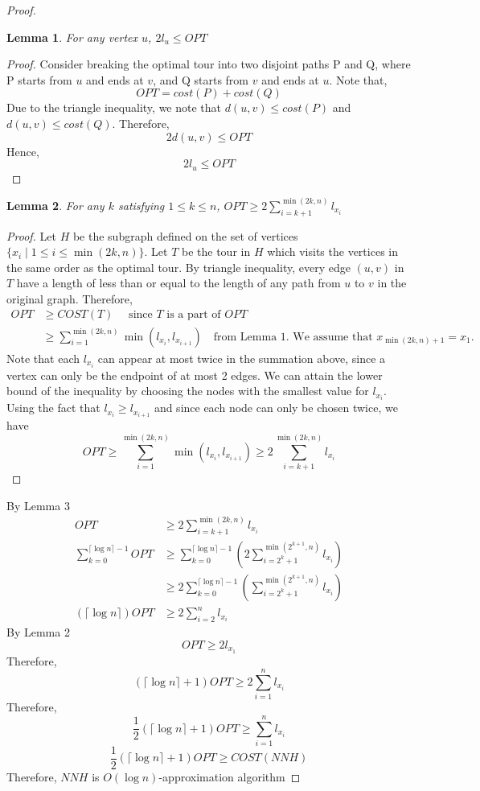\documentclass[paper=a4, fontsize=11pt]{scrartcl}	%
\numberwithin{equation}{section}		%
\numberwithin{figure}{section}			%
\numberwithin{table}{section}				%
\newtheorem{lemma}{Lemma}
\begin{document}
\begin{proof}
\begin{lemma}
For any vertex $u$, $2l_{u}\leq OPT$
\end{lemma}
\begin{proof}
Consider breaking the optimal tour into two disjoint paths P and Q, where P starts from $u$ and ends at $v$, and Q starts from $v$ and ends at $u$. Note that, 
\[OPT = cost(P) + cost(Q)\]
Due to the triangle inequality, we note that $d(u,v)\leq cost(P)$ and $d(u,v)\leq cost(Q)$. Therefore, 
\[2d(u,v)\leq OPT\]
Hence, 
\[2l_{u}\leq OPT\]
\end{proof}
\begin{lemma}
For any $k$ satisfying $1\leq k\leq n$, $OPT\geq 2\sum\limits_{i=k+1}^{\min(2k,n)}l_{x_i}$
\end{lemma}
\begin{proof}
Let $H$ be the subgraph defined on the set of vertices $\{x_i\mid 1\leq i \leq \min(2k,n)\}$. Let $T$ be the tour in $H$ which visits the vertices in the same order as the optimal tour. By triangle inequality, every edge $(u,v)$ in $T$ have a length of less than or equal to the length of any path from $u$ to $v$ in the original graph. Therefore, 
\begin{align*}
OPT&\geq COST(T)\quad\text{ since $T$ is a part of $OPT$}\\
&\geq \sum\limits_{i=1}^{\min(2k,n)}\min(l_{x_i}, l_{x_{i+1}}) \quad\text{from Lemma 1. We assume that $x_{\min(2k, n)+1} = x_1$.}
\end{align*}
Note that each $l_{x_i}$ can appear at most twice in the summation above, since a vertex can only be the endpoint of at most 2 edges. We can attain the lower bound of the inequality by choosing the nodes with the smallest value for $l_{x_i}$. Using the fact that $l_{x_i} \ge l_{x_{i+1}}$ and since each node can only be chosen twice, we have
\[OPT\geq \sum\limits_{i=1}^{\min(2k,n)}\min(l_{x_i}, l_{x_{i+1}})\geq 2\sum\limits_{i=k+1}^{\min(2k,n)}l_{x_i}\]
\end{proof}
By Lemma 3
\begin{align*}
OPT &\geq 2\sum\limits_{i=k+1}^{\min(2k,n)}l_{x_i}\\
\sum\limits_{k=0}^{\lceil{\log n}\rceil-1}{OPT}&\geq \sum\limits_{k=0}^{\lceil{\log n}\rceil-1}\left(2\sum\limits_{i=2^{k}+1}^{\min(2^{k+1},n)}l_{x_i}\right)\\
&\geq 2\sum\limits_{k=0}^{\lceil{\log n}\rceil-1}\left(\sum\limits_{i=2^{k}+1}^{\min(2^{k+1},n)}l_{x_i}\right)\\
(\lceil\log n\rceil)OPT &\geq 2\sum\limits_{i=2}^{n}l_{x_i}
\end{align*}
By Lemma 2
\[OPT\geq 2l_{x_{1}}\]
Therefore,
\[(\lceil\log n\rceil+1)OPT\geq 2\sum\limits_{i=1}^{n}l_{x_i}\]
Therefore,
\[\frac{1}{2}(\lceil\log n\rceil+1)OPT\geq\sum\limits_{i=1}^{n}l_{x_i}\]
\[\frac{1}{2}(\lceil\log n\rceil+1)OPT\geq COST(NNH)\]
Therefore, $NNH$ is $O(\log n)$-approximation algorithm
\end{proof}
\end{document}
